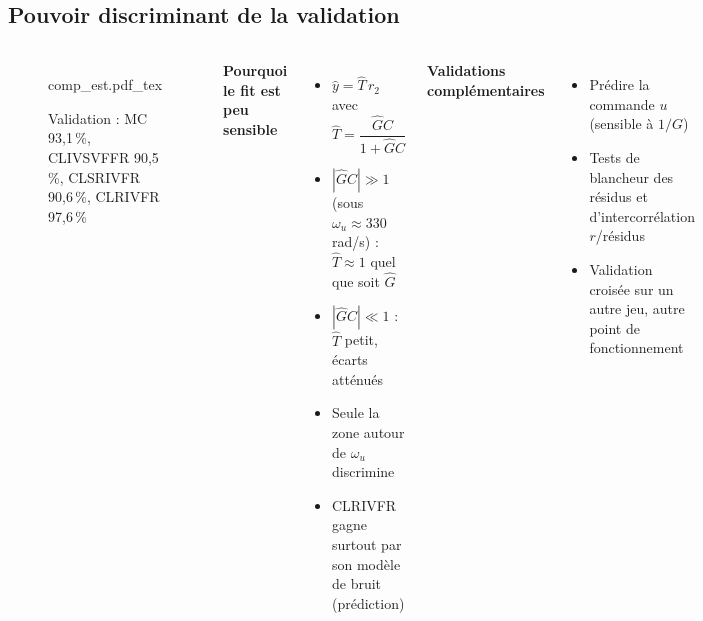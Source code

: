 \subsection*{Pouvoir discriminant de la validation}
\begin{frame}

    \begin{columns}[c]
        \begin{figure}
            \centering
            {\fontsize{5pt}{5pt}\selectfont
                \def\svgwidth{\textwidth}
                {comp_est.pdf_tex}}
            \caption{Validation : MC 93,1\,\%, CLIVSVFFR 90,5\,\%, CLSRIVFR 90,6\,\%, CLRIVFR 97,6\,\%}
        \end{figure}

        \textbf{Pourquoi le fit est peu sensible}
        \begin{itemize}
            \item $\hat{y} = \hat{T}\,r_2$ avec $\hat{T} = \dfrac{\hat{G}C}{1+\hat{G}C}$
            \item $|\hat{G}C| \gg 1$ (sous $\omega_u \approx 330$\,rad/s) : $\hat{T} \approx 1$ quel que soit $\hat{G}$
            \item $|\hat{G}C| \ll 1$ : $\hat{T}$ petit, écarts atténués
            \item Seule la zone autour de $\omega_u$ discrimine
            \item CLRIVFR gagne surtout par son \alert{modèle de bruit} (prédiction)
        \end{itemize}
        \textbf{Validations complémentaires}
        \begin{itemize}
            \item Prédire la \alert{commande} $u$ (sensible à $1/G$)
            \item Tests de blancheur des résidus et d'intercorrélation $r$/résidus
            \item Validation croisée sur un autre jeu, autre point de fonctionnement
        \end{itemize}
    \end{columns}
\end{frame}

